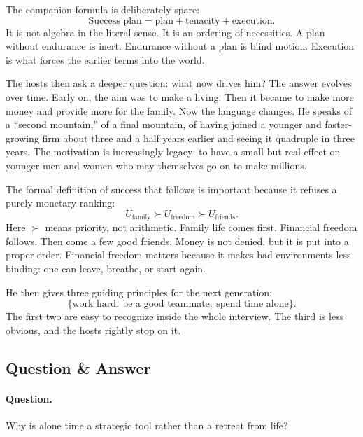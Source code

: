 The companion formula is deliberately spare:
\begin{equation}
\text{Success plan}=\text{plan}+\text{tenacity}+\text{execution}.
\end{equation}
It is not algebra in the literal sense. It is an ordering of necessities. A plan without endurance is inert. Endurance without a plan is blind motion. Execution is what forces the earlier terms into the world.

The hosts then ask a deeper question: what now drives him? The answer evolves over time. Early on, the aim was to make a living. Then it became to make more money and provide more for the family. Now the language changes. He speaks of a ``second mountain,'' of a final mountain, of having joined a younger and faster-growing firm about three and a half years earlier and seeing it quadruple in three years. The motivation is increasingly legacy: to have a small but real effect on younger men and women who may themselves go on to make millions.

The formal definition of success that follows is important because it refuses a purely monetary ranking:
\begin{equation}
U_{\text{family}} \succ U_{\text{freedom}} \succ U_{\text{friends}}.
\end{equation}
Here \(\succ\) means priority, not arithmetic. Family life comes first. Financial freedom follows. Then come a few good friends. Money is not denied, but it is put into a proper order. Financial freedom matters because it makes bad environments less binding: one can leave, breathe, or start again.

He then gives three guiding principles for the next generation:
\begin{equation}
\{\text{work hard},\ \text{be a good teammate},\ \text{spend time alone}\}.
\end{equation}
The first two are easy to recognize inside the whole interview. The third is less obvious, and the hosts rightly stop on it.

\subsection{Question \& Answer}

\paragraph{Question.} Why is alone time a strategic tool rather than a retreat from life?

